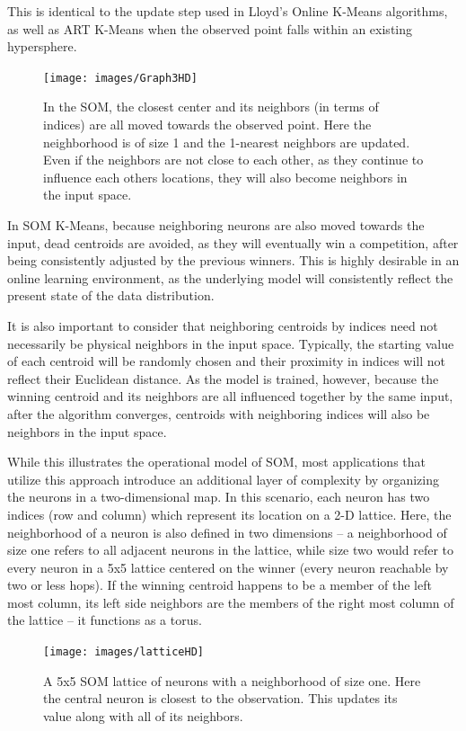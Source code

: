 \documentclass{l4proj}
\begin{document}
This is identical to the update step used in Lloyd's Online K-Means algorithms, as well as ART K-Means when the observed point falls within an existing hypersphere.

\begin{figure}[H]
	\centering
    \texttt{[image: images/Graph3HD]}
    \caption{In the SOM, the closest center and its neighbors (in terms of indices) are all moved towards the observed point. Here the neighborhood is of size 1 and the 1-nearest neighbors are updated. Even if the neighbors are not close to each other, as they continue to influence each others locations, they will also become neighbors in the input space.} 
    \label{somGraph}
\end{figure}

In SOM K-Means, because neighboring neurons are also moved towards the input, dead centroids are avoided, as they will eventually win a competition, after being consistently adjusted by the previous winners. This is highly desirable in an online learning environment, as the underlying model will consistently reflect the present state of the data distribution.

It is also important to consider that neighboring centroids by indices need not necessarily be physical neighbors in the input space. Typically, the starting value of each centroid will be randomly chosen and their proximity in indices will not reflect their Euclidean distance. As the model is trained, however, because the winning centroid and its neighbors are all influenced together by the same input, after the algorithm converges, centroids with neighboring indices will also be neighbors in the input space.

While this illustrates the operational model of SOM, most applications that utilize this approach introduce an additional layer of complexity by organizing the neurons in a two-dimensional map. In this scenario, each neuron has two indices (row and column) which represent its location on a 2-D lattice. Here, the neighborhood of a neuron is also defined in two dimensions -- a neighborhood of size one refers to all adjacent neurons in the lattice, while size two would refer to every neuron in a 5x5 lattice centered on the winner (every neuron reachable by two or less hops). If the winning centroid happens to be a member of the left most column, its left side neighbors are the members of the right most column of the lattice -- it functions as a torus.

\begin{figure}[H]
	\centering
    \texttt{[image: images/latticeHD]}
    \caption{A 5x5 SOM lattice of neurons with a neighborhood of size one. Here the central neuron is closest to the observation. This updates its value along with all of its neighbors.} 
    \label{somLattice}
\end{figure}
\end{document}

